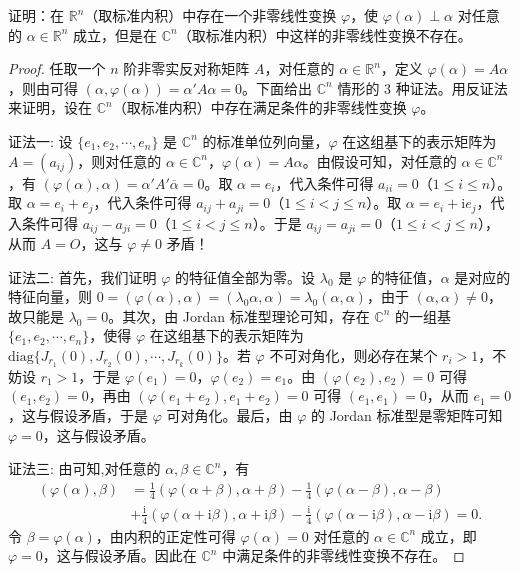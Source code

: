 \documentclass[../../main.tex]{subfiles}%
\begin{document}
\begin{proposition}\label{proposition:例9.10}
证明：在 $\mathbb{R}^n$（取标准内积）中存在一个非零线性变换 $\varphi$，使 $\varphi(\alpha)\perp\alpha$ 对任意的 $\alpha\in\mathbb{R}^n$ 成立，但是在 $\mathbb{C}^n$（取标准内积）中这样的非零线性变换不存在。
\end{proposition}
\begin{proof}
任取一个 $n$ 阶非零实反对称矩阵 $A$，对任意的 $\alpha\in\mathbb{R}^n$，定义 $\varphi(\alpha)=A\alpha$，则由可得 $(\alpha,\varphi(\alpha))=\alpha'A\alpha = 0$。下面给出 $\mathbb{C}^n$ 情形的 3 种证法。用反证法来证明，设在 $\mathbb{C}^n$（取标准内积）中存在满足条件的非零线性变换 $\varphi$。

{\color{blue}证法一:}
设 $\{e_1,e_2,\cdots,e_n\}$ 是 $\mathbb{C}^n$ 的标准单位列向量，$\varphi$ 在这组基下的表示矩阵为 $A=(a_{ij})$，则对任意的 $\alpha\in\mathbb{C}^n$，$\varphi(\alpha)=A\alpha$。由假设可知，对任意的 $\alpha\in\mathbb{C}^n$，有 $(\varphi(\alpha),\alpha)=\alpha'A'\overline{\alpha}=0$。取 $\alpha = e_i$，代入条件可得 $a_{ii}=0$（$1\leqslant  i\leqslant  n$）。取 $\alpha = e_i + e_j$，代入条件可得 $a_{ij}+a_{ji}=0$（$1\leqslant  i<j\leqslant  n$）。取 $\alpha = e_i + \mathrm{i}e_j$，代入条件可得 $a_{ij}-a_{ji}=0$（$1\leqslant  i<j\leqslant  n$）。于是 $a_{ij}=a_{ji}=0$（$1\leqslant  i<j\leqslant  n$），从而 $A = O$，这与 $\varphi\neq0$ 矛盾！

{\color{blue}证法二:}
首先，我们证明 $\varphi$ 的特征值全部为零。设 $\lambda_0$ 是 $\varphi$ 的特征值，$\alpha$ 是对应的特征向量，则 $0 = (\varphi(\alpha),\alpha)=(\lambda_0\alpha,\alpha)=\lambda_0(\alpha,\alpha)$，由于 $(\alpha,\alpha)\neq0$，故只能是 $\lambda_0 = 0$。其次，由 Jordan 标准型理论可知，存在 $\mathbb{C}^n$ 的一组基 $\{e_1,e_2,\cdots,e_n\}$，使得 $\varphi$ 在这组基下的表示矩阵为 $\mathrm{diag}\{J_{r_1}(0),J_{r_2}(0),\cdots,J_{r_k}(0)\}$。若 $\varphi$ 不可对角化，则必存在某个 $r_i>1$，不妨设 $r_1>1$，于是 $\varphi(e_1)=0$，$\varphi(e_2)=e_1$。由 $(\varphi(e_2),e_2)=0$ 可得 $(e_1,e_2)=0$，再由 $(\varphi(e_1 + e_2),e_1 + e_2)=0$ 可得 $(e_1,e_1)=0$，从而 $e_1 = 0$，这与假设矛盾，于是 $\varphi$ 可对角化。最后，由 $\varphi$ 的 Jordan 标准型是零矩阵可知 $\varphi = 0$，这与假设矛盾。

{\color{blue}证法三:}
由可知,对任意的 $\alpha,\beta\in\mathbb{C}^n$，有
\begin{align*}
(\varphi(\alpha),\beta)&=\frac{1}{4}(\varphi(\alpha + \beta),\alpha + \beta)-\frac{1}{4}(\varphi(\alpha - \beta),\alpha - \beta)\\
&+\frac{\mathrm{i}}{4}(\varphi(\alpha + \mathrm{i}\beta),\alpha + \mathrm{i}\beta)-\frac{\mathrm{i}}{4}(\varphi(\alpha - \mathrm{i}\beta),\alpha - \mathrm{i}\beta)=0.
\end{align*}
令 $\beta = \varphi(\alpha)$，由内积的正定性可得 $\varphi(\alpha)=0$ 对任意的 $\alpha\in\mathbb{C}^n$ 成立，即 $\varphi = 0$，这与假设矛盾。因此在 $\mathbb{C}^n$ 中满足条件的非零线性变换不存在。
\end{proof}
\end{document}
